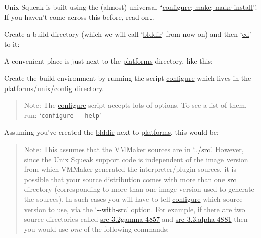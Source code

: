 \documentclass{article}
\newcommand{\cmd}{\url}
\newcommand{\cmd}{\texttt}
\newenvironment{note}{\begin{quote}\color{red} Note: }{\end{quote}}
\begin{document}
Unix Squeak is built using the (almost) universal ``\cmd{configure;
make; make install}''.  If you haven't come across this before, read on\ldots

Create a build
directory (which we will call `\cmd{blddir}' from now on)
and then `\cmd{cd}' to it:

A convenient place is just next to the \cmd{platforms} directory,
like this:

Create the build
environment by running the script \cmd{configure} which
lives in the \cmd{platforms/unix/config} directory.

\begin{note}
The \cmd{configure} script accepts lots of options.  To see a list of
them, run: `\verb|configure --help|'
\end{note}

Assuming you've created the \cmd{blddir} next to \cmd{platforms},
this would be:

\begin{note}
This assumes that the VMMaker sources are in `\cmd{../src}'.  However,
since the Unix Squeak support code is independent of the image version
from which VMMaker generated the interpreter/plugin sources, it is
possible that your source distribution comes with more than one
\cmd{src} directory (corresponding to more than one image version used
to generate the sources).  In such cases you will have to tell
\cmd{configure} which source version to use, via the `\html{-}\cmd{--with-src}'
option.  For example, if there
are two source directories called \cmd{src-3.2gamma-4857} and
\cmd{src-3.3.alpha-4881} then you would use \emph{one} of the
following commands:
\end{note}
\end{document}
